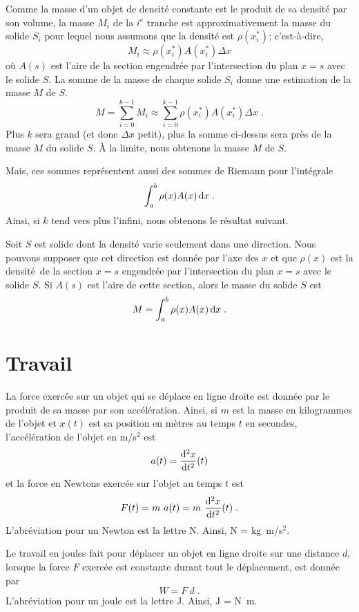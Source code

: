 {Comme la masse d'un objet de densité constante est le produit de sa densité
par son volume, la masse $M_i$ de la $i^e$ tranche est approximativement la
masse du solide $S_i$ pour lequel nous assumons que la densité est
$\rho(x_i^\ast)$; c'est-à-dire,
\[
M_i \approx \rho(x_i^\ast) A(x_i^\ast) \Delta x
\]
où $A(s)$ est l'aire de la section engendrée par l'intersection du plan $x=s$
avec le solide $S$.  La somme de la masse de chaque solide $S_i$ donne une
estimation de la masse $M$ de $S$.
\[
M = \sum_{i=0}^{k-1} M_i \approx \sum_{i=0}^{k-1}
\rho(x_i^\ast) A(x_i^\ast) \Delta x \; .
\]
Plus $k$ sera grand (et donc $\Delta x$ petit), plus la somme ci-dessus sera
près de la masse $M$ du solide $S$.  À la limite, nous obtenons la masse $M$ de
$S$.

Mais, ces sommes représentent aussi des sommes de Riemann pour l'intégrale
\[
\int_a^b \rho(x) A(x)\,\mathrm{d}x \; .
\]
Ainsi, si $k$ tend vers plus l'infini, nous obtenons le résultat suivant.

\begin{meth} 
Soit $S$ est solide dont la densité varie seulement dans une
direction.  Nous pouvons supposer que cet direction est donnée par l'axe
des $x$ et que $\rho(x)$ est la \lgm densité\rgm\ de la section $x=s$
engendrée par l'intersection du plan $x=s$ avec le solide $S$.  Si
$A(s)$ est l'aire de cette section, alors le masse du solide $S$ est
\begin{equation}\label{comp_mass}
M = \int_a^b \rho(x)A(x)\,\mathrm{d}x \; .
\end{equation}
\end{meth}

\section{Travail \eng}

La force exercée sur un objet qui se déplace en ligne droite est donnée par
le produit de sa masse par son accélération.  Ainsi, si $m$ est la masse en
kilogrammes de l'objet et $x(t)$ est sa position en mètres au temps $t$ en
secondes, l'accélération de l'objet en m/s$^2$ est
\[
a(t) = \frac{\mathrm{d}^{2}x}{\mathrm{d}t^{2}}(t)
\]
et la force en Newtons exercée sur l'objet au temps $t$ est
\[
F(t) = m\ a(t) = m \ \frac{\mathrm{d}^{2}x}{\mathrm{d}t^{2}}(t) \; .
\]
L'abréviation pour un Newton est la lettre N.  Ainsi, N = kg\ m/s$^2$.

Le travail en joules fait pour déplacer un objet en ligne droite sur une
distance $d$, lorsque la force $F$ exercée est constante durant tout le
déplacement, est donnée par
\begin{equation} \label{force}
W = F\ d \; .
\end{equation}
L'abréviation pour un joule est la lettre J.  Ainsi, J = N\ m.

}

